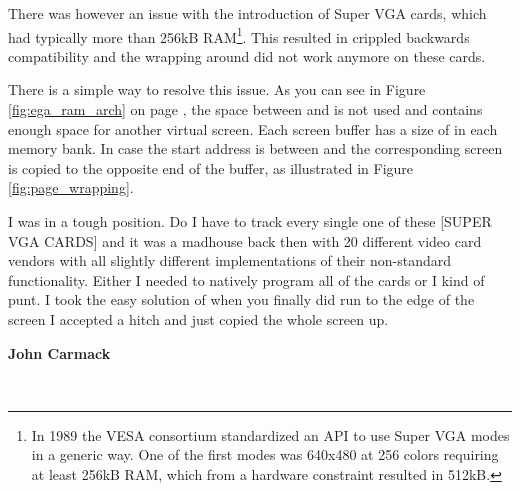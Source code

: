 \documentclass[book.tex]{subfiles}
\begin{document}
There was however an issue with the introduction of Super VGA cards, which had typically more than 256kB RAM\footnote{In 1989 the VESA consortium standardized an API to use Super VGA modes in a generic way. One of the first modes was 640x480 at 256 colors requiring at least 256kB RAM, which from a hardware constraint resulted in 512kB.}. This resulted in crippled backwards compatibility and the wrapping around  did not work anymore on these cards. \\
\par
There is a simple way to resolve this issue. As you can see in Figure \ref{fig:ega_ram_arch} on page \pageref{fig:ega_ram_arch}, the space between  and  is not used and contains enough space for another virtual screen. Each screen buffer has a size of  in each memory bank. In case the start address is between  and  the corresponding screen is copied to the opposite end of the buffer, as illustrated in Figure \ref{fig:page_wrapping}.\\

\par

\begin{fancyquotes}
I was in a tough position. Do I have to track every single one of these [SUPER VGA CARDS] and it was a madhouse back then with 20 different video card vendors with all slightly different implementations of their non-standard functionality. Either I needed to natively program all of the cards or I kind of punt. I took the easy solution of when you finally did run to the edge of the screen I accepted a hitch and just copied the whole screen up.\\
\par
\textbf{John Carmack}
\end{fancyquotes}\\
\end{document}
